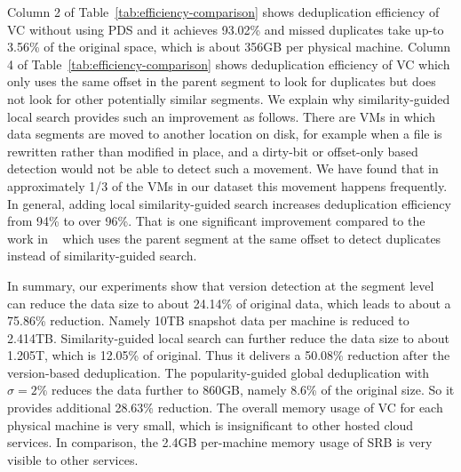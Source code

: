Column 2 of Table~\ref{tab:efficiency-comparison} shows deduplication efficiency of VC without 
using PDS and it achieves 93.02\% and  missed duplicates take  up-to  3.56\% of the original space, which
is about 356GB per physical machine. 
Column 4 of Table~\ref{tab:efficiency-comparison} shows deduplication efficiency of VC which only uses
the same offset in the parent segment to look for duplicates  but does not look for other potentially
similar segments. 
We explain why similarity-guided local search provides such an improvement as follows.
There are VMs in which data  segments are moved to another location on disk, for example 
when a file is rewritten
rather than modified in place,  
and a dirty-bit or offset-only based detection would not be able to detect such a movement.
We have found that in
approximately 1/3 of the VMs in our dataset this movement happens frequently.
In general, adding local similarity-guided search increases deduplication efficiency from 94\% to over 96\%.
That is one significant improvement compared to the work in ~\cite{WeiZhangIEEE}
which uses the parent segment at the same offset to detect duplicates instead of similarity-guided search.

In summary, our experiments show that
version detection at the segment level can reduce the data size to about 24.14\% of original data, 
which leads to about a 75.86\% reduction. Namely 10TB snapshot data per machine is reduced to 2.414TB.
Similarity-guided local search can further reduce the data size
to about 1.205T, which is  12.05\% of original. Thus it delivers a 50.08\% reduction after the version-based
 deduplication.
The popularity-guided global deduplication with $\sigma=2\% $
reduces the data further to 860GB, namely 8.6\% of the original size. 
So it provides additional 28.63\% reduction. 
The overall memory usage of VC for each physical machine is very small, which is insignificant to other 
hosted cloud services.  In comparison, the 2.4GB per-machine memory usage of SRB is very visible 
to other services.

